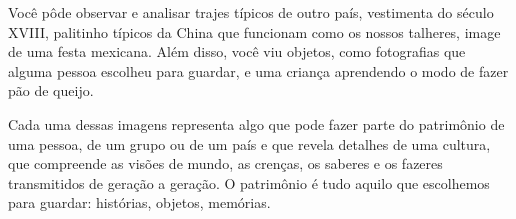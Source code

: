 \begin{escolha}
{%
%
%
%
%
%
%
%
%

Você pôde observar e analisar trajes típicos de outro país, vestimenta do
século XVIII, palitinho típicos da China que funcionam como os nossos talheres,
image de uma festa mexicana. Além disso, você viu objetos, como fotografias que alguma pessoa
escolheu para guardar, e uma criança aprendendo o modo de
fazer pão de queijo.

Cada uma dessas imagens representa algo que pode fazer parte do patrimônio de uma pessoa, de
um grupo ou de um país e que revela detalhes de uma cultura, que compreende as visões de mundo, as crenças, os saberes e os
fazeres transmitidos de geração a geração. O patrimônio é tudo aquilo que escolhemos para guardar: histórias,
objetos, memórias.

}
\end{escolha}
